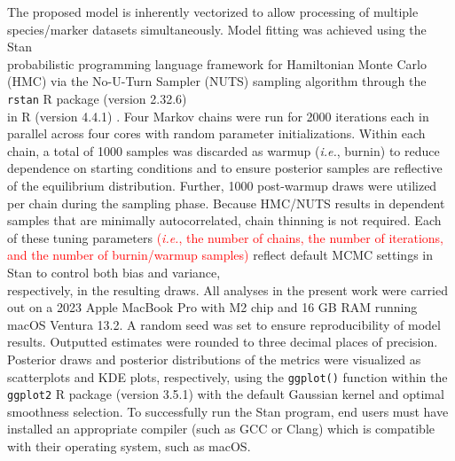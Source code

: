 \documentclass[12pt]{article}
\begin{document}
The proposed model is inherently vectorized to allow processing of multiple \\ species/marker datasets simultaneously. Model fitting was achieved using the Stan \\ probabilistic programming language \citep{carpenter2017stan} framework for Hamiltonian Monte Carlo (HMC) \citep{neal2011mcmc} via the No-U-Turn Sampler (NUTS) sampling algorithm \citep{hoffman2014no} through the {\tt rstan} R package (version 2.32.6) \\ \citep{stan2023rstan} in R (version 4.4.1) \citep{rcore2024language}. Four Markov chains were run for 2000 iterations each in parallel across four cores with random parameter initializations. Within each chain, a total of 1000 samples was discarded as warmup (\textit{i.e.}, burnin) to reduce dependence on starting conditions and to ensure posterior samples are reflective of the equilibrium distribution. Further, 1000 post-warmup draws were utilized per chain during the sampling phase. Because HMC/NUTS results in dependent samples that are minimally autocorrelated, chain thinning is not required. Each of these tuning parameters \textcolor{red}{(\textit{i.e.}, the number of chains, the number of iterations, and the number of burnin/warmup samples)} reflect default MCMC settings in Stan to control both bias and variance, \\ respectively, in the resulting draws. All analyses in the present work were carried out on a 2023 Apple MacBook Pro with M2 chip and 16 GB RAM running macOS Ventura 13.2. A random seed was set to ensure reproducibility of model results. Outputted estimates were rounded to three decimal places of precision. Posterior draws and posterior distributions of the metrics were visualized as scatterplots and KDE plots, respectively, using the {\tt ggplot()} function within the {\tt ggplot2} R package (version 3.5.1) \citep{wickham2016ggplot2} with the default Gaussian kernel and optimal smoothness selection. To successfully run the Stan program, end users must have installed an appropriate compiler (such as GCC or Clang) which is compatible with their operating system, such as macOS.
\end{document}
